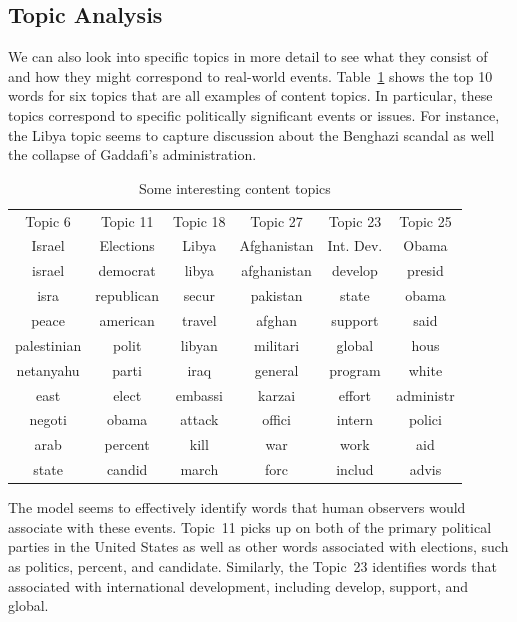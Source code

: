 \documentclass[12pt]{article}
\theoremstyle{definition}
\theoremstyle{algodesc}
\begin{document}
\subsection{Topic Analysis}
We can also look into specific topics in more detail to see what they consist of and how they might correspond to real-world events. Table~\ref{tab:content_topics} shows the top 10 words for six topics that are all examples of content topics. In particular, these topics correspond to specific politically significant events or issues. For instance, the Libya topic seems to capture discussion about the Benghazi scandal as well the collapse of Gaddafi's administration.

\begin{table}[h] \centering
\begin{tabular}{cccccc}
  \toprule
  Topic 6     & Topic 11   & Topic 18 & Topic 27    & Topic 23  & Topic 25 \\
  Israel      & Elections  & Libya    & Afghanistan & Int. Dev. & Obama \\
  \midrule
  israel      & democrat   & libya    & afghanistan & develop   & presid \\
  isra        & republican & secur    & pakistan    & state     & obama \\
  peace       & american   & travel   & afghan      & support   & said \\
  palestinian & polit      & libyan   & militari    & global    & hous \\
  netanyahu   & parti      & iraq     & general     & program   & white \\
  east        & elect      & embassi  & karzai      & effort    & administr \\
  negoti      & obama      & attack   & offici      & intern    & polici \\
  arab        & percent    & kill     & war         & work      & aid \\
  state       & candid     & march    & forc        & includ    & advis \\
  \bottomrule
\end{tabular}
\caption{Some interesting content topics}
\label{tab:content_topics}
\end{table}

The model seems to effectively identify words that human observers would associate with these events. Topic~11 picks up on both of the primary political parties in the United States as well as other words associated with elections, such as politics, percent, and candidate. Similarly, the Topic~23 identifies words that associated with international development, including develop, support, and global.
\end{document}
